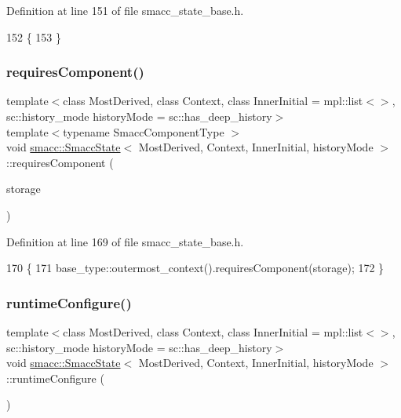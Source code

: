 Definition at line 151 of file smacc\+\_\+state\+\_\+base.\+h.


\begin{DoxyCode}
152     \{
153     \}
\end{DoxyCode}
\mbox{\label{classsmacc_1_1SmaccState_a2febb778d5c3d80b9c034576b5a92b65}} 
\subsubsection{\texorpdfstring{requires\+Component()}{requiresComponent()}}
{\footnotesize\ttfamily template$<$class Most\+Derived, class Context, class Inner\+Initial = mpl\+::list$<$$>$, sc\+::history\+\_\+mode history\+Mode = sc\+::has\+\_\+deep\+\_\+history$>$ \\
template$<$typename Smacc\+Component\+Type $>$ \\
void \hyperlink{classsmacc_1_1SmaccState}{smacc\+::\+Smacc\+State}$<$ Most\+Derived, Context, Inner\+Initial, history\+Mode $>$\+::requires\+Component (\begin{DoxyParamCaption}\item[{Smacc\+Component\+Type $\ast$\&}]{storage }\end{DoxyParamCaption})\hspace{0.3cm}{\ttfamily [inline]}}



Definition at line 169 of file smacc\+\_\+state\+\_\+base.\+h.


\begin{DoxyCode}
170     \{
171       base\_type::outermost\_context().requiresComponent(storage);
172     \}
\end{DoxyCode}
\mbox{\label{classsmacc_1_1SmaccState_a6995704a0232e24f4c38250302c0a01f}} 
\subsubsection{\texorpdfstring{runtime\+Configure()}{runtimeConfigure()}}
{\footnotesize\ttfamily template$<$class Most\+Derived, class Context, class Inner\+Initial = mpl\+::list$<$$>$, sc\+::history\+\_\+mode history\+Mode = sc\+::has\+\_\+deep\+\_\+history$>$ \\
void \hyperlink{classsmacc_1_1SmaccState}{smacc\+::\+Smacc\+State}$<$ Most\+Derived, Context, Inner\+Initial, history\+Mode $>$\+::runtime\+Configure (\begin{DoxyParamCaption}{ }\end{DoxyParamCaption})\hspace{0.3cm}{\ttfamily [inline]}}



